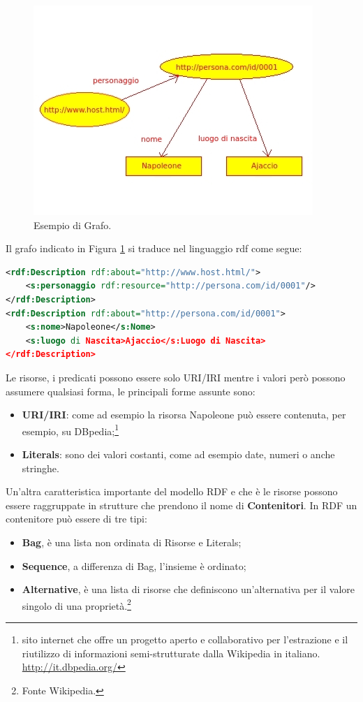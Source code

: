 \documentclass[a4paper,11pt]{article}
\begin{document}
\begin{figure}[ht]
	\centering
	\includegraphics[scale=1]{Napoleone.jpeg}
	\caption{Esempio di Grafo.}
	\label{fig:3}
\end{figure}
Il grafo indicato in Figura \ref{fig:3} si traduce nel linguaggio rdf come segue:
\begin{lstlisting}[language=XML, basicstyle=\large]
<rdf:Description rdf:about="http://www.host.html/">
	<s:personaggio rdf:resource="http://persona.com/id/0001"/>
</rdf:Description>
<rdf:Description rdf:about="http://persona.com/id/0001">
 	<s:nome>Napoleone</s:Nome>
 	<s:luogo di Nascita>Ajaccio</s:Luogo di Nascita>
</rdf:Description>

\end{lstlisting}
\newpage
Le risorse, i predicati possono essere solo URI/IRI mentre i valori però possono assumere qualsiasi forma, le principali forme assunte sono:
\begin{itemize}
	\item \textbf{URI/IRI}: come ad esempio la risorsa Napoleone può essere contenuta, per esempio, su DBpedia;\footnote{ sito internet che offre un progetto aperto e collaborativo per l’estrazione e il riutilizzo di informazioni semi-strutturate dalla Wikipedia in italiano. \url{http://it.dbpedia.org/}}
	\item \textbf{Literals}: sono dei valori costanti, come ad esempio date, numeri o anche stringhe.
\end{itemize}
Un'altra caratteristica importante del modello RDF e che è le risorse possono essere raggruppate in strutture che prendono il nome di \textbf{Contenitori}. In RDF un contenitore può essere di tre tipi:
\begin{itemize}
	\item \textbf{Bag}, è una lista non ordinata di Risorse e Literals;
	\item \textbf{Sequence}, a differenza di Bag, l'insieme è ordinato;
	\item \textbf{Alternative}, è una lista di risorse che definiscono un'alternativa per il valore singolo di una proprietà.\footnote{Fonte Wikipedia.}
\end{itemize} 
\end{document}
